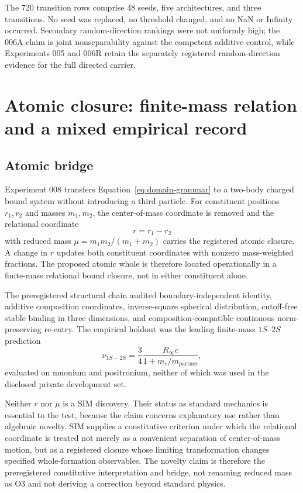 \documentclass[11pt,a4paper]{article}
\begin{document}
The 720 transition rows comprise 48 seeds, five architectures, and three transitions. No seed was replaced, no threshold changed, and no NaN or Infinity occurred. Secondary random-direction rankings were not uniformly high; the 006A claim is joint nonseparability against the competent additive control, while Experiments 005 and 006R retain the separately registered random-direction evidence for the full directed carrier.

\section{Atomic closure: finite-mass relation and a mixed empirical record}

\subsection{Atomic bridge}

Experiment 008 transfers Equation~\eqref{eq:domain-grammar} to a two-body charged bound system without introducing a third particle. For constituent positions $r_1,r_2$ and masses $m_1,m_2$, the center-of-mass coordinate is removed and the relational coordinate
\begin{equation}
 r=r_1-r_2
\end{equation}
with reduced mass $\mu=m_1m_2/(m_1+m_2)$ carries the registered atomic closure. A change in $r$ updates both constituent coordinates with nonzero mass-weighted fractions. The proposed atomic whole is therefore located operationally in a finite-mass relational bound closure, not in either constituent alone.

The preregistered structural chain audited boundary-independent identity, additive composition coordinates, inverse-square spherical distribution, cutoff-free stable binding in three dimensions, and composition-compatible continuous norm-preserving re-entry. The empirical holdout was the leading finite-mass $1S$--$2S$ prediction
\begin{equation}
 \nu_{1S-2S}=\frac{3}{4}\frac{R_\infty c}{1+m_e/m_{\mathrm{partner}}},
 \label{eq:atomic-leading}
\end{equation}
evaluated on muonium and positronium, neither of which was used in the disclosed private development set.

Neither $r$ nor $\mu$ is a SIM discovery. Their status as standard mechanics is essential to the test, because the claim concerns explanatory use rather than algebraic novelty. SIM supplies a constitutive criterion under which the relational coordinate is treated not merely as a convenient separation of center-of-mass motion, but as a registered closure whose limiting transformation changes specified whole-formation observables. The novelty claim is therefore the preregistered constitutive interpretation and bridge, not renaming reduced mass as O3 and not deriving a correction beyond standard physics.
\end{document}
